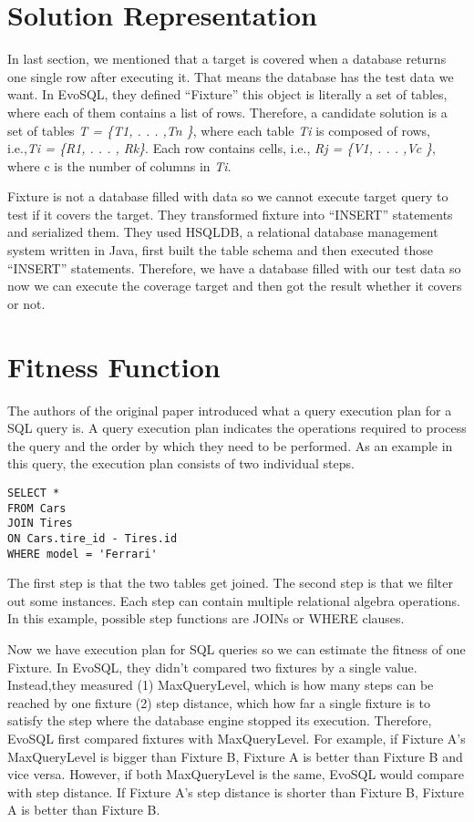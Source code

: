 \section{Solution Representation}
In last section, we mentioned that a target is covered when a database returns one single row after executing it. That means the database has the test data we want. In EvoSQL, they defined “Fixture” this object is literally a set of tables, where each of them contains a list of rows. Therefore, a candidate solution is a set of tables \textit{T = \{T1, . . . ,Tn \}}, where each table \textit{Ti} is composed of rows, i.e.,\textit{Ti = \{R1, . . . , Rk\}}. Each row contains cells, i.e., \textit{Rj = \{V1, . . . ,Vc \}}, where c is the number of columns in \textit{Ti}. 

Fixture is not a database filled with data so we cannot execute target query to test if it covers the target. They transformed fixture into “INSERT” statements and serialized them. They used HSQLDB, a relational database management system written in Java, first built the table schema and then executed those “INSERT” statements. Therefore, we have a database filled with our test data so now we can execute the coverage target and then got the result whether it covers or not.

\section{Fitness Function}
The authors of the original paper introduced what a query execution plan for a SQL query is. A query execution plan indicates the operations required to process the query and the order by which they need to be performed. As an example in this query, the execution plan consists of two individual steps.
\begin{verbatim}
SELECT * 
FROM Cars
JOIN Tires
ON Cars.tire_id - Tires.id
WHERE model = 'Ferrari'
\end{verbatim}

The first step is that the two tables get joined. The second step is that we filter out some instances. Each step can contain multiple relational algebra operations. In this example, possible step functions are JOINs or WHERE clauses.

Now we have execution plan for SQL queries so we can estimate the fitness of one Fixture. In EvoSQL, they didn't compared two fixtures by a single value. Instead,they measured (1) MaxQueryLevel, which is how many steps can be reached by one fixture (2) step distance, which how far a single fixture is to satisfy the step where the database engine stopped its execution. Therefore, EvoSQL first compared fixtures with MaxQueryLevel. For example, if Fixture A's MaxQueryLevel is bigger than Fixture B, Fixture A is better than Fixture B and vice versa. However, if both MaxQueryLevel is the same, EvoSQL would compare with step distance. If Fixture A's step distance is shorter than Fixture B, Fixture A is better than Fixture B. 

